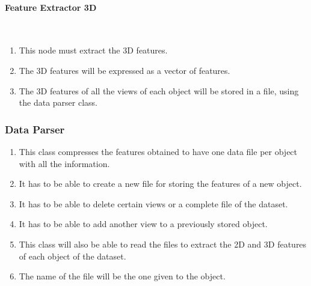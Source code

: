   \paragraph{Feature Extractor 3D}\mbox{}\\
     \begin{enumerate}[label=\textbf{FR\threedigits*}, leftmargin=2cm]
  \setcounter{enumi}{\value{saveenum}}
   	\item This node must extract the 3D features. 
	\item The 3D features will be expressed as a vector of features. %
	\item The 3D features of all the views of each object will be stored in a file, using the data parser class.  
   \setcounter{saveenum}{\value{enumi}}
\end{enumerate}

\subsubsection{Data Parser}
   \begin{enumerate}[label=\textbf{FR\threedigits*}, leftmargin=2cm]
  \setcounter{enumi}{\value{saveenum}}
\item This class compresses the features obtained to have one data file per object with all the information.
 
\item It has to be able to create a new file for storing the features of a new object. 
\item It has to be able to delete certain views or a complete file of the dataset. 
\item It has to be able to add another view to a previously stored object. 

\item This class will also be able to read the files to extract the 2D and 3D features of each object of the dataset. 

\item The name of the file will be the one given to the object. 

   \setcounter{saveenum}{\value{enumi}}
\end{enumerate}
			
